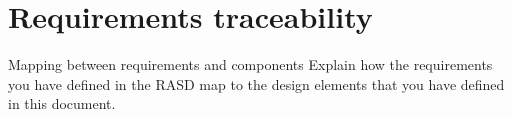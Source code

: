 \section{Requirements traceability}
Mapping between requirements and components
Explain how the requirements you have defined in the RASD map to the design elements that you have defined in this document.